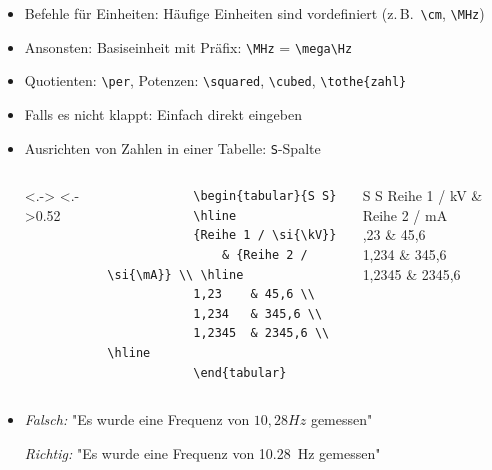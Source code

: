 \begin{frame}[<+->][fragile]
	\begin{itemize}
		\item Befehle für Einheiten: Häufige Einheiten sind vordefiniert (z.\,B.\ \lstinline!\cm!, \lstinline!\MHz!)
		\item Ansonsten: Basiseinheit mit Präfix: \lstinline!\MHz! = \lstinline!\mega\Hz!
		\item Quotienten: \lstinline!\per!, Potenzen: \lstinline!\squared!, \lstinline!\cubed!, \lstinline!\tothe{zahl}!
		\item Falls es nicht klappt: Einfach direkt eingeben
		\item Ausrichten von Zahlen in einer Tabelle: \lstinline!S!-Spalte
		\begin{columns}<.->
			\lstset{basicstyle=\footnotesize\ttfamily}
			\hspace{0.5cm}
			\column<.->{0.52\textwidth}
			\begin{lstlisting}
			\begin{tabular}{S S}
			\hline
			{Reihe 1 / \si{\kV}}
			    & {Reihe 2 / \si{\mA}} \\ \hline
			1,23	& 45,6 \\
			1,234	& 345,6 \\
			1,2345	& 2345,6 \\ \hline
			\end{tabular}
			\end{lstlisting}
			\rmfamily
			\begin{tabular}{S S}
			\hline
			{Reihe 1 / \si{\kV}}
			    & {Reihe 2 / \si{\mA}} \\ ,23	& 45,6 \\
			1,234	& 345,6 \\
			1,2345	& 2345,6 \\ \hline
			\end{tabular}
		\end{columns}
		\item \emph{Falsch:} "{\rmfamily Es wurde eine Frequenz von $10,28 Hz$ gemessen}"
		
		\emph{Richtig:} "{\rmfamily Es wurde eine Frequenz von \SI[detect-family=true]{10,28}{Hz} gemessen}"
	\end{itemize}
\end{frame}

